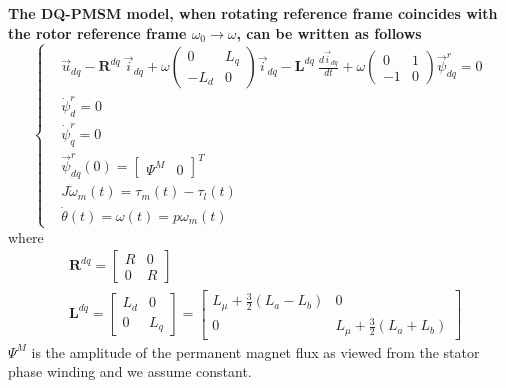 \documentclass[12pt,a4paper,oneside]{book}
\begin{document}
\begin{onehalfspace}
\begin{mybox}
	\textbf{The DQ-PMSM model, when rotating reference frame coincides with 
		the rotor reference frame $\omega_0 \rightarrow \omega$, can be written 
		as follows}
	\begin{equation}\label{twophase_eq2}
		\left\lbrace \begin{aligned}
			& \vec{u}_{dq}-\mathbf{R}^{dq}\ \vec{i}_{dq} + 
			\omega\begin{pmatrix} 0 & L_q\\ -L_d & 0 
			\end{pmatrix}\vec{i}_{dq} - \mathbf{L}^{dq}\ 
			\frac{d\vec{i}_{dq}}{dt} + \omega\begin{pmatrix} 0 & 1\\-1 & 0 
			\end{pmatrix}\vec{\psi}_{dq}^r = 0\\[6pt]
			&\dot{\psi}_d^r = 0 \\[6pt]
			&\dot{\psi}_q^r = 0 \\[6pt]
			& \vec{\psi}^r_{dq}(0) = \begin{bmatrix} \Psi^M &  0 
			\end{bmatrix}^T \\[6pt]
			& J\dot{\omega}_m(t) = \tau_m(t)-\tau_l(t) \\[6pt]
			& \dot{\theta}(t) = \omega(t) = p\omega_m(t) 
		\end{aligned} \right. 
	\end{equation}
	where
	\begin{equation*}
		\begin{aligned}
			& \mathbf{R}^{dq} = 
			\begin{bmatrix} R &  0 \\
				0 & R
			\end{bmatrix} \\[6pt]
			& \mathbf{L}^{dq} = 
			\begin{bmatrix} L_d &  0 \\
				0 & L_q
			\end{bmatrix} =
			\begin{bmatrix} L_\mu+\frac{3}{2}(L_a-L_b) &  0 \\
				0 & L_\mu+\frac{3}{2}(L_a+L_b)
			\end{bmatrix}
		\end{aligned} 
	\end{equation*}
	$\Psi^M$ is the amplitude of the permanent magnet flux as viewed from 
	the stator phase winding and we assume constant.
\end{mybox}


\end{onehalfspace}
\end{document}
